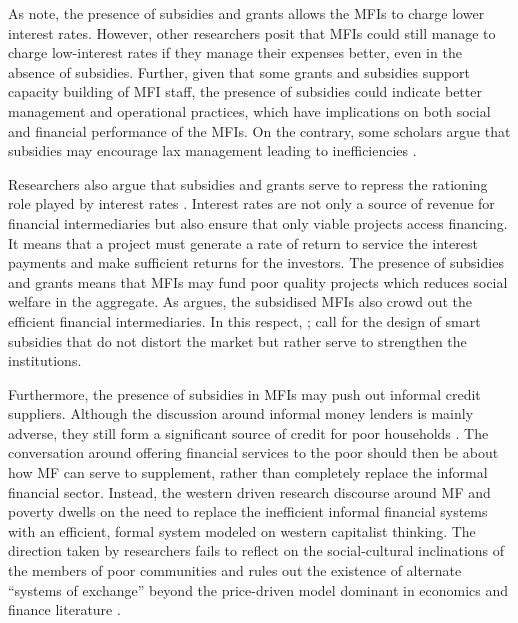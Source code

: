 \documentclass[a4paper, nobind]{templates/ociamthesis}
\begin{document}
As \textcite{hudon2010management} note, the presence of subsidies and grants allows the MFIs to charge lower interest rates. However, other researchers posit that MFIs could still manage to charge low-interest rates if they manage their expenses better, even in the absence of subsidies. Further, given that some grants and subsidies support capacity building of MFI staff, the presence of subsidies could indicate better management and operational practices, which have implications on both social and financial performance of the MFIs. On the contrary, some scholars argue that subsidies may encourage lax management leading to inefficiencies \autocite{ghosh2013microfinance}.

Researchers also argue that subsidies and grants serve to repress the rationing role played by interest rates \autocite{hudon2010management}. Interest rates are not only a source of revenue for financial intermediaries but also ensure that only viable projects access financing. It means that a project must generate a rate of return to service the interest payments and make sufficient returns for the investors. The presence of subsidies and grants means that MFIs may fund poor quality projects which reduces social welfare in the aggregate. As \textcite{kota2007microfinance} argues, the subsidised MFIs also crowd out the efficient financial intermediaries. In this respect, \textcite{ghosh2013microfinance}; \textcite{bayai2016financing} call for the design of smart subsidies that do not distort the market but rather serve to strengthen the institutions.

Furthermore, the presence of subsidies in MFIs may push out informal credit suppliers. Although the discussion around informal money lenders is mainly adverse, they still form a significant source of credit for poor households \autocite{klapper2015role}. The conversation around offering financial services to the poor should then be about how MF can serve to supplement, rather than completely replace the informal financial sector. Instead, the western driven research discourse around MF and poverty dwells on the need to replace the inefficient informal financial systems with an efficient, formal system modeled on western capitalist thinking. The direction taken by researchers fails to reflect on the social-cultural inclinations of the members of poor communities\autocite{chester2016one} and rules out the existence of alternate ``systems of exchange'' beyond the price-driven model dominant in economics and finance literature \autocite{biggart2004systems}.
\end{document}
